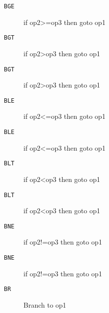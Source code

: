 
\begin{description}
\item[\texttt{BGE        }]  if op2>=op3 then goto op1\\
\end{description}

\begin{description}
\item[\texttt{BGT        }]  if op2>op3 then goto op1\\
\end{description}

\begin{description}
\item[\texttt{BGT        }]  if op2>op3 then goto op1\\
\end{description}

\begin{description}
\item[\texttt{BLE        }]  if op2<=op3 then goto op1\\
\end{description}

\begin{description}
\item[\texttt{BLE        }]  if op2<=op3 then goto op1\\
\end{description}

\begin{description}
\item[\texttt{BLT        }]  if op2<op3 then goto op1\\
\end{description}

\begin{description}
\item[\texttt{BLT        }]  if op2<op3 then goto op1\\
\end{description}

\begin{description}
\item[\texttt{BNE        }]  if op2!=op3 then goto op1\\
\end{description}

\begin{description}
\item[\texttt{BNE        }]  if op2!=op3 then goto op1\\
\end{description}

\begin{description}
\item[\texttt{BR         }]  Branch to op1\\
\end{description}
